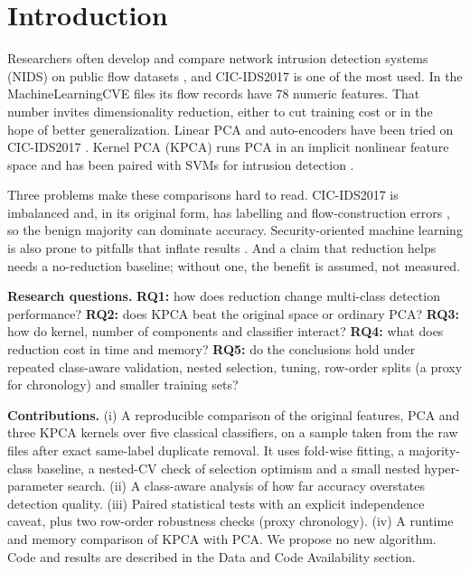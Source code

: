 \documentclass[runningheads]{llncs}
\begin{document}
\section{Introduction}
Researchers often develop and compare network intrusion detection systems (NIDS) on public flow datasets \cite{ring2019}, and CIC-IDS2017 \cite{sharafaldin2018} is one of the most used. In the MachineLearningCVE files its flow records have 78 numeric features. That number invites dimensionality reduction, either to cut training cost or in the hope of better generalization. Linear PCA and auto-encoders have been tried on CIC-IDS2017 \cite{abdulhammed2019}. Kernel PCA (KPCA) \cite{scholkopf1998} runs PCA in an implicit nonlinear feature space and has been paired with SVMs for intrusion detection \cite{kuang2014}.

Three problems make these comparisons hard to read. CIC-IDS2017 is imbalanced and, in its original form, has labelling and flow-construction errors \cite{engelen2021,panigrahi2018}, so the benign majority can dominate accuracy. Security-oriented machine learning is also prone to pitfalls that inflate results \cite{arp2022}. And a claim that reduction helps needs a no-reduction baseline; without one, the benefit is assumed, not measured.

\textbf{Research questions.} \textbf{RQ1:} how does reduction change multi-class detection performance? \textbf{RQ2:} does KPCA beat the original space or ordinary PCA? \textbf{RQ3:} how do kernel, number of components and classifier interact? \textbf{RQ4:} what does reduction cost in time and memory? \textbf{RQ5:} do the conclusions hold under repeated class-aware validation, nested selection, tuning, row-order splits (a proxy for chronology) and smaller training sets?

\textbf{Contributions.} (i) A reproducible comparison of the original features, PCA and three KPCA kernels over five classical classifiers, on a sample taken from the raw files after exact same-label duplicate removal. It uses fold-wise fitting, a majority-class baseline, a nested-CV check of selection optimism and a small nested hyper-parameter search. (ii) A class-aware analysis of how far accuracy overstates detection quality. (iii) Paired statistical tests with an explicit independence caveat, plus two row-order robustness checks (proxy chronology). (iv) A runtime and memory comparison of KPCA with PCA. We propose no new algorithm. Code and results are described in the Data and Code Availability section.
\end{document}
